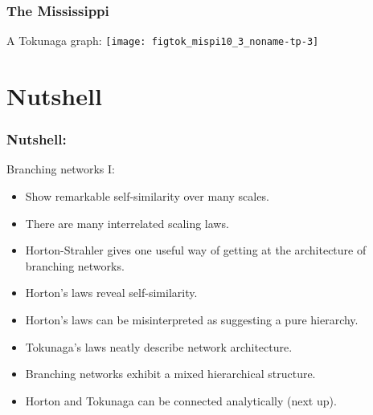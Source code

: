 \begin{frame}[label=]
  \frametitle{The Mississippi}

  \begin{block}{A Tokunaga graph:}
    \texttt{[image: figtok\_mispi10\_3\_noname-tp-3]}    
  \end{block}

\end{frame}

\section{Nutshell}

\begin{frame}[label=]
  \frametitle{Nutshell:}

  \begin{block}{Branching networks I:}
    \begin{itemize}
    \item<1->
      Show remarkable \alert{self-similarity} over many scales.
    \item<2->
      There are many interrelated scaling laws.
    \item<3->
      Horton-Strahler  gives one useful way of 
      getting at the architecture of branching networks.
    \item<4->
      \alert{Horton's laws} reveal self-similarity.
    \item<5->
      Horton's laws can be misinterpreted as
      suggesting a pure hierarchy.
    \item<6->
      \alert{Tokunaga's laws} neatly describe network architecture.
    \item<7->
      Branching networks exhibit a mixed hierarchical structure.
    \item<8->
      Horton and Tokunaga can be connected analytically (next up).
    \end{itemize}
  \end{block}

\end{frame}


